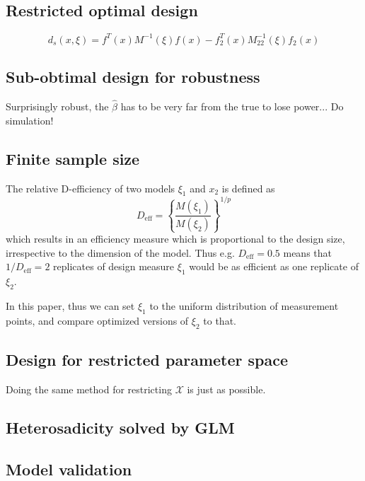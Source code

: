 \documentclass[12pt]{iopart}
\begin{document}
\subsection{Restricted optimal design}

\begin{equation}
d_s(x, \xi) = f^T(x) M^{-1}(\xi)f(x) - f_2^T(x) M_{22}^{-1}(\xi)f_2(x)
\label{eq:dsvar}
\end{equation}

\subsection{Sub-obtimal design for robustness}

Surprisingly robust, the $\hat \beta$ has to be very far from the true to lose power... Do simulation!

\subsection{Finite sample size}

The relative D-efficiency of two models $\xi_1$ and $x_2$ is defined as
\begin{equation}
D_\mathrm{eff} = \left\{\frac{M(\xi_1)}{M(\xi_2)}\right\}^{1/p}
\end{equation}
which results in an efficiency measure which is proportional to the design size, irrespective to the dimension of the model. Thus e.g. $D_\mathrm{eff} = 0.5$ means that $1 / D_\mathrm{eff} = 2$ replicates of design measure $\xi_1$ would be as efficient as one replicate of $\xi_2$.

In this paper, thus we can set $\xi_1$ to the uniform distribution of measurement points, and compare optimized versions of $\xi_2$ to that.

\subsection{Design for restricted parameter space}

Doing the same method for restricting $\mathcal{X}$ is just as possible.

\subsection{Heterosadicity solved by GLM}
\subsection{Model validation}
\end{document}
